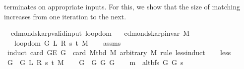 \begin{isabellebody}
\begin{isamarkuptext}
terminates on appropriate inputs. For this, we show that the size of matching  increases
from one iteration to the next.%
\end{isamarkuptext}\isamarkuptrue%
\isamarkupfalse%
\ {\isacharparenleft}{\kern0pt}\ edmonds{\isacharunderscore}{\kern0pt}karp{\isacharunderscore}{\kern0pt}valid{\isacharunderscore}{\kern0pt}input{\isacharparenright}{\kern0pt}\ loop{\isacharprime}{\kern0pt}{\isacharunderscore}{\kern0pt}dom{\isacharcolon}{\kern0pt}\isanewline
\ \ \ {\isachardoublequoteopen}edmonds{\isacharunderscore}{\kern0pt}karp{\isacharunderscore}{\kern0pt}invar{\isacharprime}{\kern0pt}{\isacharprime}{\kern0pt}\ M{\isachardoublequoteclose}\isanewline
\ \ \ {\isachardoublequoteopen}loop{\isacharprime}{\kern0pt}{\isacharunderscore}{\kern0pt}dom\ {\isacharparenleft}{\kern0pt}G{\isacharcomma}{\kern0pt}\ L{\isacharcomma}{\kern0pt}\ R{\isacharcomma}{\kern0pt}\ s{\isacharcomma}{\kern0pt}\ t{\isacharcomma}{\kern0pt}\ M{\isacharparenright}{\kern0pt}{\isachardoublequoteclose}\isanewline
%
\isadelimproof
\ \ %
\endisadelimproof
%
\isatagproof
{}\isamarkupfalse%
\ assms%
\endisatagproof
{\isafoldproof}%
%
\isadelimproof
\isanewline
%
\endisadelimproof
%
\isadelimvisible
%
\endisadelimvisible
%
\isatagvisible
{}\isamarkupfalse%
\ {\isacharparenleft}{\kern0pt}induct\ {\isachardoublequoteopen}card\ {\isacharparenleft}{\kern0pt}G{\isachardot}{\kern0pt}E\ G{\isacharparenright}{\kern0pt}\ {\isacharminus}{\kern0pt}\ card\ {\isacharparenleft}{\kern0pt}M{\isacharunderscore}{\kern0pt}tbd\ M{\isacharparenright}{\kern0pt}{\isachardoublequoteclose}\ arbitrary{\isacharcolon}{\kern0pt}\ M\ rule{\isacharcolon}{\kern0pt}\ less{\isacharunderscore}{\kern0pt}induct{\isacharparenright}{\kern0pt}\isanewline
\ \ \isamarkupfalse%
\ less\isanewline
\ \ \isamarkupfalse%
\ {\isacharquery}{\kern0pt}G{}\ {\isacharequal}{\kern0pt}\ {\isachardoublequoteopen}G{}\ L\ R\ s\ t\ M{\isachardoublequoteclose}\isanewline
\ \ \isamarkupfalse%
\ {\isacharquery}{\kern0pt}G{}\ {\isacharequal}{\kern0pt}\ {\isachardoublequoteopen}G{}\ G\ {\isacharquery}{\kern0pt}G{}{\isachardoublequoteclose}\isanewline
\ \ \isamarkupfalse%
\ {\isacharquery}{\kern0pt}m\ {\isacharequal}{\kern0pt}\ {\isachardoublequoteopen}alt{\isacharunderscore}{\kern0pt}bfs\ {\isacharquery}{\kern0pt}G{}\ {\isacharquery}{\kern0pt}G{}\ s{\isachardoublequoteclose}\isanewline

\end{isabellebody}
